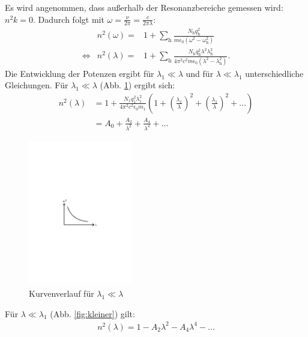 Es wird angenommen, dass außerhalb der Resonanzbereiche gemessen wird: $n^2 k=0$.
Dadurch folgt mit $\omega=\frac{\nu}{2 \pi}=\frac{c}{2 \pi \lambda}$:
\begin{align*}
                  &n^2(\omega)=   & 1+\sum_{\text{h}} \frac{N_{\text{h}} q_{\text{h}}^2}{m \epsilon_{\text{0}}\left(\omega^2-\omega^2_{\text{h}} \right)}\\
  \Leftrightarrow &n^2(\lambda)=  & 1+\sum_{\text{h}} \frac{N_{\text{h}} q_{\text{h}}^2 \lambda^2 \lambda_{\text{h}}^2 }{ 4 \pi^2 c^2 m \epsilon_{\text{0}}\left(\lambda^2-\lambda^2_{\text{h}} \right)}.
\end{align*}
Die Entwicklung der Potenzen ergibt für $\lambda_{\text{1}} \ll \lambda$ und für $\lambda \ll \lambda_{\text{1}}$ unterschiedliche Gleichungen.
Für $\lambda_{\text{1}} \ll \lambda$ (Abb. \ref{fig:größer}) ergibt sich:
\begin{align}
  n^2(\lambda)  &=   1+ \frac{N_{\text{1}} q_{\text{1}}^2 \lambda_{\text{1}}^2}{4 \pi^2 c^2 \epsilon_{\text{0}} m_{\text{1}}} \left(1 + \left( \frac{\lambda_{\text{1}}}{\lambda} \right)^2 + \left( \frac{\lambda_{\text{1}}}{\lambda} \right)^2 + ...\right)\\
                &=   A_{\text{0}} + \frac{A_{\text{2}}}{\lambda^2} + \frac{A_{\text{4}}}{\lambda^4} + ...
  \label{eqn:größer}
\end{align}
\begin{figure}[h!]
  \centering
  \includegraphics[width=0.4\textwidth]{größer.pdf}
  \caption{Kurvenverlauf für $\lambda_{\text{1}} \ll \lambda$ \cite{1}}
  \label{fig:größer}
\end{figure}
\FloatBarrier
Für $\lambda \ll \lambda_{\text{1}}$ (Abb. \ref{fig:kleiner}) gilt:
\begin{align}
  n^2(\lambda)=1 - A_{\text{2}} \lambda^2 - A_{\text{4}} \lambda^4 - ...
  \label{eqn:kleiner}
\end{align}
